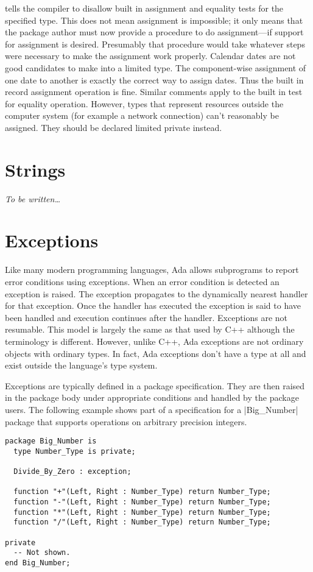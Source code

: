 tells the compiler to disallow built in assignment and equality tests for the specified type.
This does not mean assignment is impossible; it only means that the package author must now
provide a procedure to do assignment---if support for assignment is desired. Presumably that
procedure would take whatever steps were necessary to make the assignment work properly.
Calendar dates are not good candidates to make into a limited type. The component-wise
assignment of one date to another is exactly the correct way to assign dates. Thus the built in
record assignment operation is fine. Similar comments apply to the built in test for equality
operation. However, types that represent resources outside the computer system (for example a
network connection) can't reasonably be assigned. They should be declared limited private
instead.

\section{Strings}

\emph{To be written\ldots}

\section{Exceptions}

Like many modern programming languages, Ada allows subprograms to report error conditions using
exceptions. When an error condition is detected an exception is raised. The exception propagates
to the dynamically nearest handler for that exception. Once the handler has executed the
exception is said to have been handled and execution continues after the handler. Exceptions are
not resumable. This model is largely the same as that used by C++ although the terminology is
different. However, unlike C++, Ada exceptions are not ordinary objects with ordinary types. In
fact, Ada exceptions don't have a type at all and exist outside the language's type system.

Exceptions are typically defined in a package specification. They are then raised in the package
body under appropriate conditions and handled by the package users. The following example shows
part of a specification for a |Big_Number| package that supports operations on arbitrary
precision integers.

\begin{lstlisting}
package Big_Number is
  type Number_Type is private;

  Divide_By_Zero : exception;

  function "+"(Left, Right : Number_Type) return Number_Type;
  function "-"(Left, Right : Number_Type) return Number_Type;
  function "*"(Left, Right : Number_Type) return Number_Type;
  function "/"(Left, Right : Number_Type) return Number_Type;

private
  -- Not shown.
end Big_Number;
\end{lstlisting}

